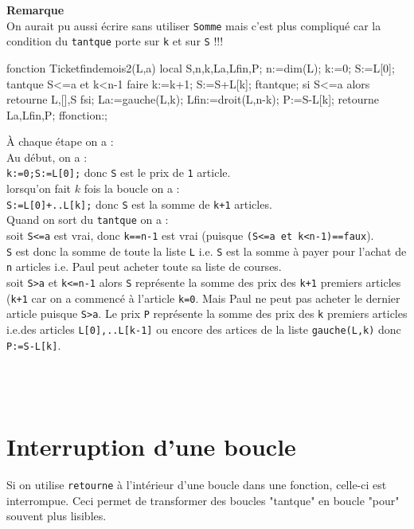 \documentclass[12pt,a4paper]{book}
\begin{document}
\begin{giacjshere}
{\bf Remarque}\\
On aurait pu aussi \'ecrire sans utiliser {\tt Somme}
mais c'est plus compliqu\'e car la condition du {\tt tantque} porte sur {\tt k}
 et sur {\tt S} !!!
\begin{giacprog}
fonction Ticketfindemois2(L,a) 
  local S,n,k,La,Lfin,P;
  n:=dim(L);
  k:=0;
  S:=L[0];
  tantque S<=a et k<n-1 faire
    k:=k+1;
    S:=S+L[k];
  ftantque;
  si S<=a alors retourne L,[],S fsi;
  La:=gauche(L,k);
  Lfin:=droit(L,n-k);
  P:=S-L[k];
 retourne La,Lfin,P;
ffonction:;
\end{giacprog}
\`A chaque \'etape on a :\\
Au d\'ebut, on a :\\
{\tt k:=0;S:=L[0];} donc  {\tt S} est le prix de {\tt 1} article.\\
lorsqu'on fait $k$ fois la boucle on a :\\
{\tt S:=L[0]+..L[k];} donc {\tt S} est la somme de {\tt k+1} articles.\\
Quand on sort du {\tt tantque} on a :\\
soit {\tt S<=a} est vrai, donc {\tt k==n-1} est vrai (puisque 
{\tt (S<=a et k<n-1)==faux}).\\
{\tt S} est donc la somme de toute la liste {\tt L} i.e. {\tt S} est la somme 
\`a payer pour l'achat de {\tt n} articles i.e. Paul peut acheter toute 
sa liste de courses.\\
soit {\tt S>a} et {\tt k<=n-1} alors {\tt S} repr\'esente la somme des prix des 
{\tt k+1} premiers articles ({\tt k+1} car on a commenc\'e \`a l'article 
{\tt k=0}. Mais Paul ne peut pas acheter le dernier 
article puisque {\tt S>a}. Le prix {\tt P} repr\'esente la somme des prix des 
{\tt k} premiers articles i.e.des articles {\tt L[0],..L[k-1]} ou encore des 
artices de la liste {\tt gauche(L,k)}  donc {\tt P:=S-L[k]}.\\
\\
\\
\\

\section{Interruption d'une boucle}
Si on utilise {\tt retourne} \`a l'int\'erieur d'une boucle dans une fonction, 
celle-ci est interrompue. Ceci permet de 
transformer des boucles "tantque" en boucle "pour" souvent plus lisibles.


\end{giacjshere}
\end{document}
